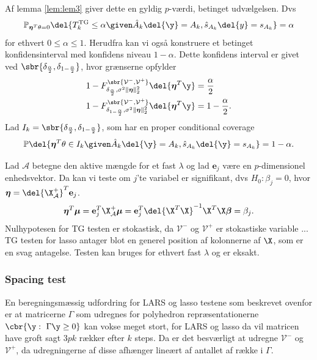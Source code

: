 Af lemma \ref{lem:lem3} giver dette en gyldig \(p\)-værdi, betinget udvælgelsen.
Dvs
\begin{align*}
\mathbb{P}_{\boldsymbol{\eta}^T \theta = 0} \del{T_k^\text{TG} \leq \alpha \given \hat{A}_k \del{\y} = A_k, \hat{s}_{A_k} \del{y} = s_{A_k}} = \alpha
\end{align*}
for ethvert \(0 \leq \alpha \leq 1\).
Herudfra kan vi også konstruere et betinget konfidensinterval med konfidens niveau \(1-\alpha\).
Dette konfidens interval er givet ved \(\sbr{\delta_{\frac{\alpha}{2}}, \delta_{1-\frac{\alpha}{2}}}\), hvor grænserne opfylder
\begin{align*}
1-F_{\delta_{\frac{\alpha}{2}}, \sigma^2 \Vert \boldsymbol{\eta} \Vert_2^2}^{\sbr{\mathcal{V}^-, \mathcal{V}^+}} \del{\boldsymbol{\eta}^T \y} &= \frac{\alpha}{2} \\
1-F_{\delta_{1-\frac{\alpha}{2}}, \sigma^2  \Vert \boldsymbol{\eta} \Vert_2^2}^{\sbr{\mathcal{V}^-, \mathcal{V}^+}} \del{\boldsymbol{\eta}^T \y} &= 1-\frac{\alpha}{2}.
\end{align*}
Lad \(I_k = \sbr{\delta_\frac{\alpha}{2},\delta_{1-\frac{\alpha}{2}}}\), som har en proper conditional coverage
\begin{align*}
\mathbb{P} \del{\boldsymbol{\eta}^T \theta \in I_k \given \hat{A}_k \del{\y} = A_k, \hat{s}_{A_k} \del{\y} = s_{A_k}} = 1-\alpha.
\end{align*}


Lad \(\mathcal{A}\) betegne den aktive mængde for et fast \(\lambda\) og lad \(\mathbf{e}_j\) være en \(p\)-dimensionel enhedsvektor.
Da kan vi teste om \(j\)'te variabel er signifikant, dvs \(H_0: \beta_j =0\), hvor \(\boldsymbol{\eta}=\del{\X_\mathcal{A}^+}^T \mathbf{e}_j\).
\begin{align*}
\boldsymbol{\eta}^T \boldsymbol{\mu} = \mathbf{e}_j^T \X_\mathcal{A}^+ \boldsymbol{\mu} = \mathbf{e}_j^T \del{\X^T \X}^{-1} \X^T \X \boldsymbol{\beta} = \beta_j.
\end{align*}
Nulhypotesen for TG testen er stokastisk, da \(\mathcal{V}^-\) og \(\mathcal{V}^+\) er stokastiske variable ...
TG testen for lasso antager blot en generel position af kolonnerne af \(\X\), som er en svag antagelse.
Testen kan bruges for ethvert fast \(\lambda\) og er eksakt.
\newpage

\subsubsection{Spacing test}
En beregningsmæssig udfordring for LARS og lasso testene som beskrevet ovenfor er at matricerne \(\Gamma\) som udregnes for polyhedron repræsentationerne \(\cbr{\y : \ \Gamma \y \geq 0}\) kan vokse meget stort, for LARS og lasso da vil matricen have groft sagt \(3pk\) rækker efter \(k\) steps.
Da er det besværligt at udregne \(\mathcal{V}^-\) og \(\mathcal{V}^+\), da udregningerne af disse afhænger lineært af antallet af række i \(\Gamma\).

